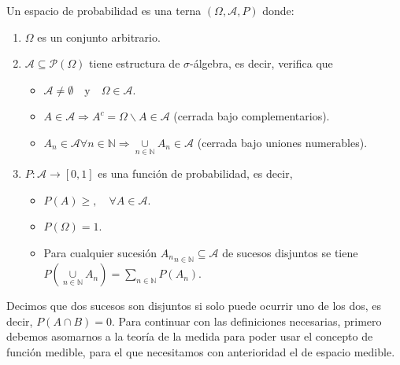 \begin{definicion}\label{def:esprob}
	Un espacio de probabilidad es una terna $(\Omega, \mathcal{A},P)$ donde:
	
	\begin{enumerate}
	
		\item $\Omega$ es un conjunto arbitrario.

		\item{$\mathcal{A} \subseteq \mathcal{P}(\Omega)$ tiene estructura de $\sigma$-álgebra, es decir, verifica que 
		
		\begin{itemize}
			\item $\mathcal{A} \neq \emptyset \quad \text{y} \quad \Omega \in \mathcal{A}$.

			\item $A \in \mathcal{A} \Rightarrow A^c = \Omega \backslash A \in \mathcal{A}$ (cerrada bajo complementarios).

			\item $A_n \in \mathcal{A} \forall n \in \mathbb{N} \Rightarrow \underset{n \in \mathbb{N}}{\cup} A_n \in \mathcal{A}$ (cerrada bajo uniones numerables).
		\end{itemize}

		}

		\item{$P:\mathcal{A} \rightarrow [0,1]$ es una función de probabilidad, es decir,

		\begin{itemize}
			\item $P(A)\geq, \quad \forall A \in \mathcal{A}$.

			\item $P(\Omega)=1$.

			\item Para cualquier sucesión ${A_n}_{n \in \mathbb{N}} \subseteq \mathcal{A}$ de sucesos disjuntos se tiene $P \left ( \underset{n \in \mathbb{N}}{\cup} A_n \right ) = \sum_{n \in \mathbb{N}} P(A_n)$.
		\end{itemize}

		}
	\end{enumerate}
\end{definicion}

Decimos que dos sucesos son disjuntos si solo puede ocurrir uno de los dos, es decir, $P(A \cap B)=0$. Para continuar con las definiciones necesarias, primero debemos asomarnos a la teoría de la medida para poder usar el concepto de función medible, para el que necesitamos con anterioridad el de espacio medible.

